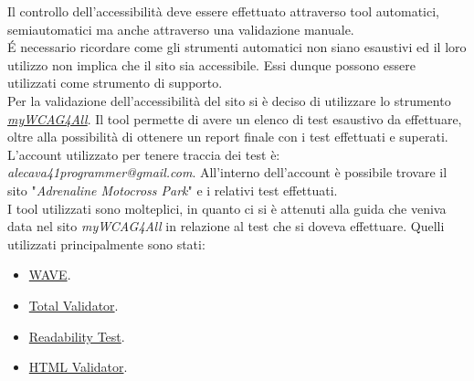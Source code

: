 Il controllo dell'accessibilità deve essere effettuato attraverso tool automatici, semiautomatici ma anche attraverso una validazione manuale.\\
É necessario ricordare come gli strumenti automatici non siano esaustivi ed il loro utilizzo non implica che il sito sia accessibile. Essi dunque possono essere utilizzati come strumento di supporto.\\
Per la validazione dell'accessibilità del sito si è deciso di utilizzare lo strumento \textit{\href{https://web.math.unipd.it/accessibility-dev/}{myWCAG4All}}. Il tool permette di avere un elenco di test esaustivo da effettuare, oltre alla possibilità di ottenere un report finale con i test effettuati e superati.\\
L'account utilizzato per tenere traccia dei test è: \textit{alecava41programmer@gmail.com}. All'interno dell'account è possibile trovare il sito "\textit{Adrenaline Motocross Park}" e i relativi test effettuati.\\
I tool utilizzati sono molteplici, in quanto ci si è attenuti alla guida che veniva data nel sito \textit{myWCAG4All} in relazione al test che si doveva effettuare. Quelli utilizzati principalmente sono stati:
\begin{itemize}
\setlength\itemsep{0em}
\item \href{https://wave.webaim.org/}{WAVE}.
\item \href{https://www.totalvalidator.com/}{Total Validator}.
\item \href{https://www.webfx.com/tools/read-able/}{Readability Test}.
\item \href{https://validator.w3.org/}{HTML Validator}.
\end{itemize}



